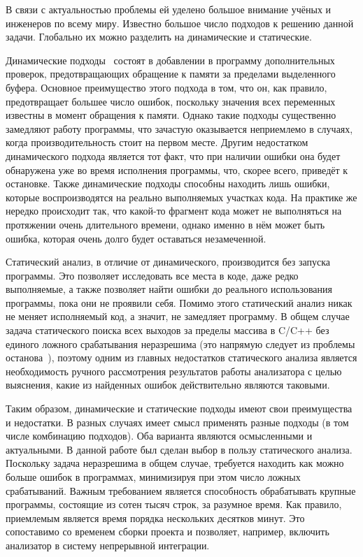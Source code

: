В связи с актуальностью проблемы ей уделено большое внимание учёных и
инженеров по всему миру. Известно большое число подходов к решению
данной задачи. Глобально их можно разделить на динамические и
статические.

Динамические подходы~\cite{cowan1998stackguard, ruwase2004practical,
  hastings1991purify} состоят в добавлении в программу дополнительных
проверок, предотвращающих обращение к памяти за пределами выделенного
буфера. Основное преимущество этого подхода в том, что он, как
правило, предотвращает большее число ошибок, поскольку значения всех
переменных известны в момент обращения к памяти. Однако такие подходы
существенно замедляют работу программы, что зачастую оказывается
неприемлемо в случаях, когда производительность стоит на первом
месте. Другим недостатком динамического подхода является тот факт, что
при наличии ошибки она будет обнаружена уже во время исполнения
программы, что, скорее всего, приведёт к остановке. Также динамические
подходы способны находить лишь ошибки, которые воспроизводятся на
реально выполняемых участках кода. На практике же нередко происходит
так, что какой-то фрагмент кода может не выполняться на протяжении
очень длительного времени, однако именно в нём может быть ошибка,
которая очень долго будет оставаться незамеченной.

Статический анализ, в отличие от динамического, производится без
запуска программы. Это позволяет исследовать все места в коде, даже
редко выполняемые, а также позволяет найти ошибки до реального
использования программы, пока они не проявили себя. Помимо этого
статический анализ никак не меняет исполняемый код, а значит, не
замедляет программу. В общем случае задача статического поиска всех
выходов за пределы массива в C/C++ без единого ложного срабатывания
неразрешима (это напрямую следует из проблемы
останова~\cite{turing1937computable}), поэтому одним из главных
недостатков статического анализа является необходимость ручного
рассмотрения результатов работы анализатора с целью выяснения, какие
из найденных ошибок действительно являются таковыми.

Таким образом, динамические и статические подходы имеют свои
преимущества и недостатки. В разных случаях имеет смысл применять
разные подходы (в том числе комбинацию подходов). Оба варианта
являются осмысленными и актуальными. В данной работе был сделан выбор
в пользу статического анализа. Поскольку задача неразрешима в общем
случае, требуется находить как можно больше ошибок в программах,
минимизируя при этом число ложных срабатываний. Важным требованием
является способность обрабатывать крупные программы, состоящие из
сотен тысяч строк, за разумное время. Как правило, приемлемым является
время порядка нескольких десятков минут. Это сопоставимо со временем
сборки проекта и позволяет, например, включить анализатор в систему
непрерывной интеграции.


